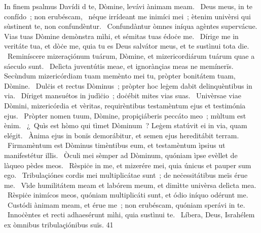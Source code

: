 { In finem psalmus Davídi}
{%
d te, Dòmine, levávi ànimam meam. 
~Deus meus, in te confído~; non erubéscam, 
~néque irrídeant me inimíci mei~; ètenim univèrsi qui sùstinent te, non confundèntur. 
~Confundàntur òmnes iníqua agèntes supervácue. Vias tuas Dòmine demònstra mìhi, et sémitas tuas édoċe me. 
~Dírige me in veritáte tua, et dòċe me, quia tu es Deus salvátor meus, et te sustìnui tota die. 
~Reminíscere mizeraçiónum tuárum, Dòmine, et mizericordiárum tuárum quae a sáeculo sunt. 
~Delìcta juventútis meae, et ignorànçias meas ne memínerïs. Secùndum mizericórdiam tuam memènto mei tu, pròpter bonitátem tuam, Dòmine. 
~Dulċis et rectus Dòminus~; pròpter hoc leġem dabit delinquèntibus in via. 
~Díriget mansuétos in judìċio~; doċébit mites vias suas. 
~Univèrsae viae Dòmini, mizericórdia et vèritas, requirèntibus testamèntum ejus et testimónia ejus. 
~Pròpter nomen tuum, Dòmine, propiçiáberis peccáto meo~; mùltum est ènim. 
~¿~Quìs est hòmo qui tìmet Dòminum~? Leġem statúvit ei in via, quam elégit. 
~Ànima ejus in bonïs demorábitur, et semen ejus hereditábit terram. 
~Firmamèntum est Dòminus timèntibus eum, et testamèntum ìpsius ut manifestétur illïs. 
~Òculi mei sèmper ad Dòminum, quóniam ìpse evèllet de làqueo pèdes meos. 
~Rèspiċe in me, et mizerére mei, quia únicus et pauper sum ego. 
~Tribulaçiónes cordis mei multiplicátae sunt~; de neċessitátibus meïs érue me. 
~Vìde humilitátem meam et labórem meum, et dimìtte univèrsa delìcta mea. 
~Rèspiċe inimícos meos, quóniam multiplicáti sunt, et ódio iníquo odérunt me. 
~Custódi ànimam meam, et érue me~; non erubéscam, quóniam sperávi in te. 
~Innoċèntes et recti adhaesérunt mìhi, quia sustìnui te. 
~Líbera, Deus, Israhélem ex òmnibus tribulaçiónibus suïs. 
}
{4}{1}
